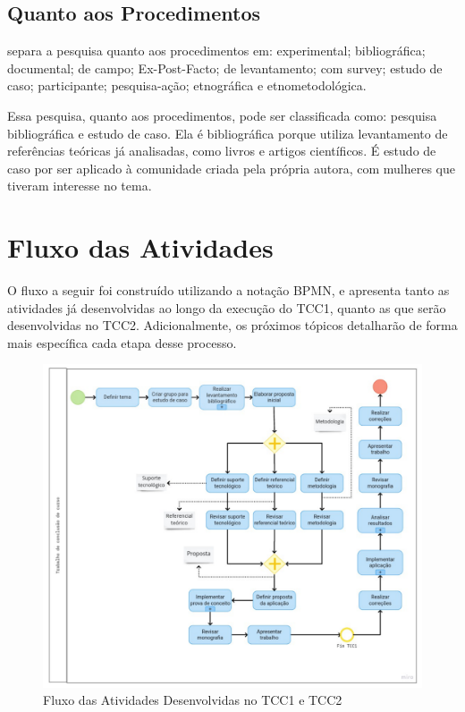 \subsection{Quanto aos Procedimentos}

 separa a pesquisa quanto aos 
procedimentos em: experimental; bibliográfica; 
documental; de campo; Ex-Post-Facto; 
de levantamento; com survey; estudo de caso; 
participante; pesquisa-ação; etnográfica e etnometodológica.

Essa pesquisa, quanto aos procedimentos, pode ser classificada como: pesquisa bibliográfica e 
estudo de caso.
Ela é bibliográfica porque utiliza levantamento de referências teóricas já analisadas, 
como livros e artigos científicos. É estudo de caso por 
ser aplicado à comunidade criada pela própria autora, com 
mulheres que tiveram interesse no tema.


\section{Fluxo das Atividades}

O fluxo a seguir foi construído utilizando a notação BPMN, e apresenta 
tanto as atividades já desenvolvidas ao longo da execução do 
TCC1, quanto as que serão desenvolvidas no TCC2. 
Adicionalmente, os próximos tópicos detalharão de 
forma mais específica cada etapa desse processo.

\begin{figure}[ht]
	\centering
	\includegraphics[keepaspectratio=true,scale=0.55]{figuras/fluxodeatividades.pdf}
	\caption{Fluxo das Atividades Desenvolvidas no TCC1 e TCC2}
        \label{fig03}
\end{figure}

